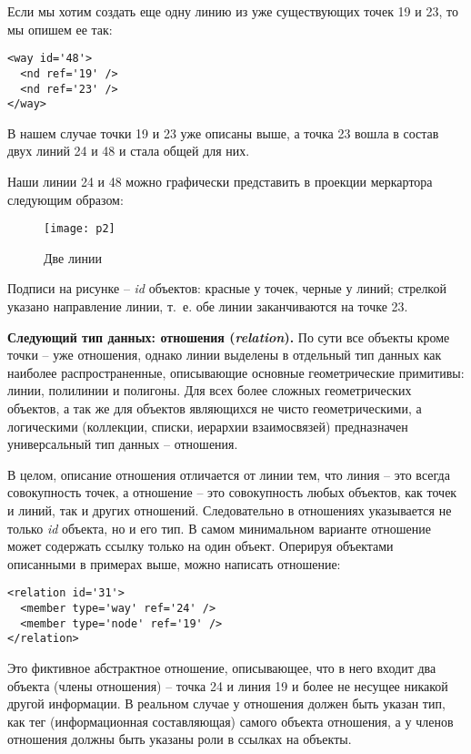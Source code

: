 Если мы хотим создать еще одну линию из уже существующих точек 19 и 23, то мы 
опишем ее так:

\small
\begin{verbatim}
<way id='48'>
  <nd ref='19' />
  <nd ref='23' />
</way>
\end{verbatim}
\normalsize

В нашем случае точки 19 и 23 уже описаны выше, а точка 23 вошла в состав двух 
линий 24 и 48 и стала общей для них.

Наши линии 24 и 48 можно графически представить в проекции меркартора следующим 
образом:

\begin{figure}[ht!]
    \center
    \texttt{[image: p2]}
    \caption{Две линии}
\end{figure}

Подписи на рисунке -- \emph{id} объектов: красные у точек, черные у линий; 
стрелкой указано направление линии, т.~е. обе линии заканчиваются на точке 23.

\textbf{Следующий тип данных: отношения (\emph{relation}).} По сути все 
объекты кроме точки -- уже отношения, однако линии выделены в отдельный тип 
данных как наиболее распространенные, описывающие основные геометрические 
примитивы: линии, полилинии и полигоны. Для всех более сложных геометрических 
объектов, а так же для объектов являющихся не чисто геометрическими, а 
логическими (коллекции, списки, иерархии взаимосвязей) предназначен 
универсальный тип данных -- отношения.

В целом, описание отношения отличается от линии тем, что линия -- это всегда 
совокупность точек, а отношение -- это совокупность любых объектов, как точек 
и линий, так и других отношений. Следовательно в отношениях указывается не 
только \emph{id} объекта, но и его тип. В самом минимальном варианте отношение 
может содержать ссылку только на один объект. Оперируя объектами описанными в 
примерах выше, можно написать отношение:

\small
\begin{verbatim}
<relation id='31'>
  <member type='way' ref='24' />
  <member type='node' ref='19' />
</relation>
\end{verbatim}
\normalsize

Это фиктивное абстрактное отношение, описывающее, что в него входит два 
объекта (члены отношения) -- точка 24 и линия 19 и более не несущее никакой 
другой информации. В реальном случае у отношения должен быть указан тип, как 
тег (информационная составляющая) самого объекта отношения, а у членов 
отношения должны быть указаны роли в ссылках на объекты.

